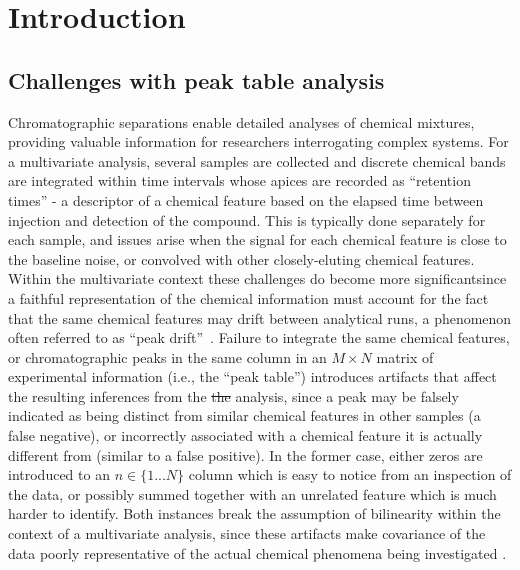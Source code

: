 \documentclass[preprint,12pt]{elsarticle}
\providecommand{\DIFadd}[1]{{\protect\color{blue}\uwave{#1}}} %
\providecommand{\DIFdel}[1]{{\protect\color{red}\sout{#1}}}                      %
\providecommand{\DIFaddbegin}{} %
\providecommand{\DIFaddend}{} %
\providecommand{\DIFdelbegin}{} %
\providecommand{\DIFdelend}{} %
\begin{document}

\section{Introduction}
\label{sec:sample1}
\subsection{Challenges with peak table analysis}
Chromatographic separations enable detailed analyses of chemical mixtures, providing valuable information for researchers interrogating complex systems. For a multivariate analysis, several samples are collected and discrete chemical bands are integrated within time intervals whose apices are recorded as ``retention times'' - a descriptor of a chemical feature based on the elapsed time between injection and detection of the compound. This is typically done separately for each sample, and issues arise when the signal for each chemical feature is close to the baseline noise, or convolved with other closely-eluting chemical features. Within the multivariate context these challenges do become more significant\DIFaddbegin \DIFadd{, }\DIFaddend since a faithful representation of the chemical information must account for the fact that the same chemical features may drift between analytical runs, a phenomenon often referred to as ``peak drift''~\cite{christensen2005chromatographic}. Failure to integrate the same chemical features, or chromatographic peaks in the same column in an $M \times N$ matrix of experimental information (i.e., the ``peak table'') introduces artifacts that affect the resulting inferences from the \DIFdelbegin \DIFdel{the }\DIFdelend analysis, since a peak may be falsely indicated as being distinct from similar chemical features in other samples (a false negative), or incorrectly associated with a chemical feature it is actually different from (similar to a false positive). In the former case, either zeros are introduced to an $n \in \{1...N\}$ column which is easy to notice from an inspection of the data, or possibly summed together with an unrelated feature which is much harder to identify. Both instances break the assumption of bilinearity within the context of a multivariate analysis, since these artifacts make covariance of the data poorly representative of the actual chemical phenomena being investigated \cite{armstrong2023parafac2,de2012integration}. 
\end{document}
